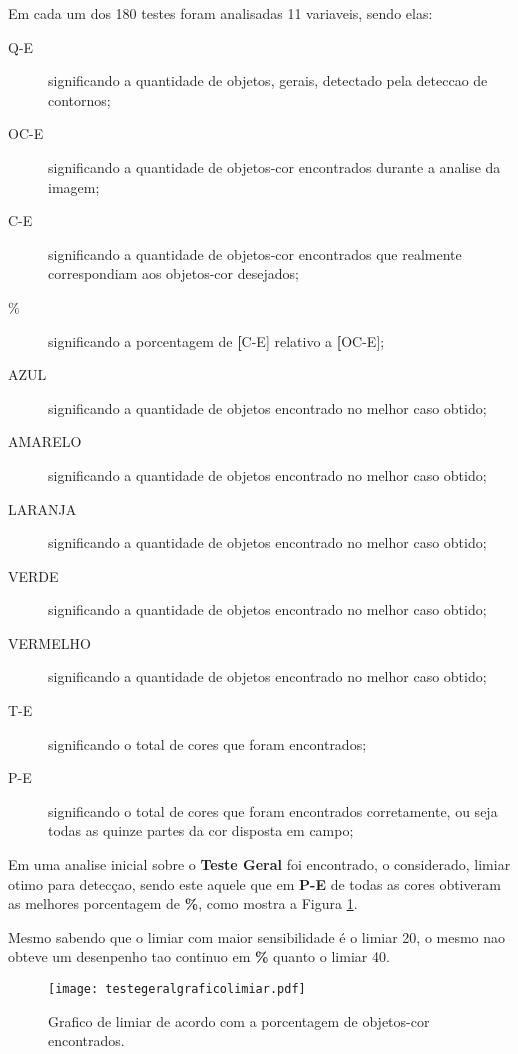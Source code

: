 Em cada um dos 180 testes foram analisadas 11 variaveis, sendo elas:
\begin{description}
\item [Q-E] significando a quantidade de objetos, gerais, detectado pela deteccao de contornos;
\item[OC-E] significando a quantidade de objetos-cor encontrados durante a analise da imagem; 
\item[C-E] significando a quantidade de objetos-cor encontrados que realmente correspondiam aos objetos-cor desejados;
\item[\%] significando a porcentagem de \textbf[C-E] relativo a \textbf[OC-E];
\item[AZUL] significando a quantidade de objetos encontrado no melhor caso obtido;
\item[AMARELO] significando a quantidade de objetos encontrado no melhor caso obtido;
\item[LARANJA] significando a quantidade de objetos encontrado no melhor caso obtido;
\item[VERDE] significando a quantidade de objetos encontrado no melhor caso obtido;
\item[VERMELHO] significando a quantidade de objetos encontrado no melhor caso obtido;
\item[T-E] significando o total de cores que foram encontrados;
\item[P-E] significando o total de cores que foram encontrados corretamente, ou seja todas as quinze partes da cor disposta em campo;
\end{description}
	
	
	
	
	Em uma analise inicial sobre o \textbf{Teste Geral} foi encontrado, o considerado, limiar otimo para detecçao, sendo este aquele que em \textbf{P-E} de todas as cores obtiveram as melhores porcentagem de \textbf{\%}, como mostra a Figura \ref{graficoanaliselimiar}. 
	
	
	
	
	Mesmo sabendo que o limiar com maior sensibilidade é o limiar 20, o mesmo nao obteve um desenpenho tao continuo em \textbf{\%} quanto o limiar 40.
	
	\begin{figure}[!: h]
		\centering
		\texttt{[image: testegeralgraficolimiar.pdf]}
		\caption{Grafico de limiar de acordo com a porcentagem de objetos-cor encontrados.}
		\label{graficoanaliselimiar}
	\end{figure}
	
